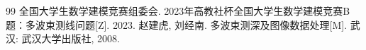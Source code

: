 
\begin{thebibliography}{99}
 全国大学生数学建模竞赛组委会. 2023年高教社杯全国大学生数学建模竞赛B题：多波束测线问题[Z]. 2023.
 赵建虎, 刘经南. 多波束测深及图像数据处理[M]. 武汉: 武汉大学出版社, 2008.
\end{thebibliography}
